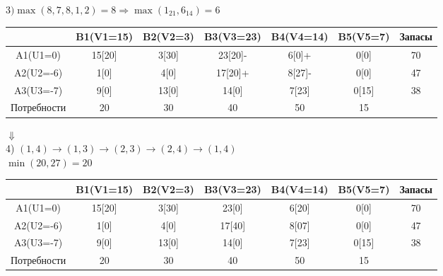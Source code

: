 \documentclass[a4paper, 12pt]{article}
\begin{document}
\begin{math}
  3) \max(8,7,8,1,2)= 8 \Rightarrow \max(1_{21},6_{14}) = 6
\end{math}
\begin{table}[H]
\centering
\begin{tabular}{|c|c|c|c|c|c|c|}
\hline
            & B1(V1=15)& B2(V2=3) & B3(V3=23) & B4(V4=14) & B5(V5=7)  & Запасы \\ \hline
A1(U1=0)    & 15[20]   & 3[30]    & 23[20]-   & 6[0]+     & 0[0]      & 70     \\ \hline
A2(U2=-6)   & 1[0]     & 4[0]     & 17[20]+   & 8[27]-    & 0[0]      & 47     \\ \hline
A3(U3=-7)   & 9[0]     & 13[0]    & 14[0]     & 7[23]     & 0[15]     & 38     \\ \hline
Потребности & 20       & 30       & 40        & 50        & 15        &        \\ \hline
\end{tabular}
\end{table}

\begin{center}
  $\Downarrow$\\
  4) $(1,4)\rightarrow(1,3)\rightarrow(2,3)\rightarrow(2,4)\rightarrow(1,4)$\\
  $\min(20,27) = 20$
\end{center}
\begin{table}[H]
\centering
\begin{tabular}{|c|c|c|c|c|c|c|}
\hline
            & B1(V1=15)& B2(V2=3) & B3(V3=23) & B4(V4=14) & B5(V5=7)  & Запасы \\ \hline
A1(U1=0)    & 15[20]   & 3[30]    & 23[0]     & 6[20]     & 0[0]      & 70     \\ \hline
A2(U2=-6)   & 1[0]     & 4[0]     & 17[40]    & 8[07]     & 0[0]      & 47     \\ \hline
A3(U3=-7)   & 9[0]     & 13[0]    & 14[0]     & 7[23]     & 0[15]     & 38     \\ \hline
Потребности & 20       & 30       & 40        & 50        & 15        &        \\ \hline
\end{tabular}
\end{table}
\end{document}
